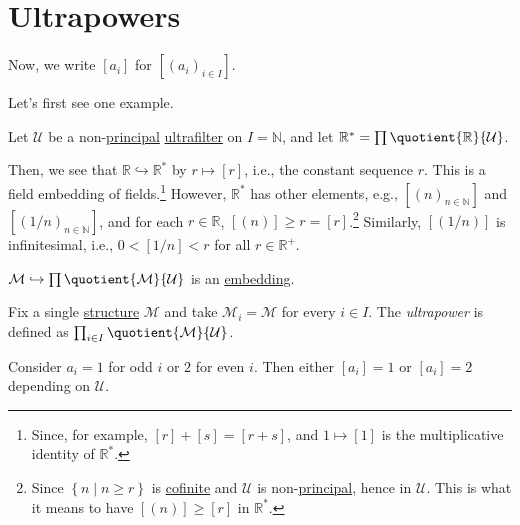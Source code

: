 \section{Ultrapowers}
\begin{notation}
	Now, we write \([a_i]\) for \([(a_i)_{i\in I}]\).
\end{notation}

Let's first see one example.

\begin{eg}
	Let \(\mathcal{U} \) be a non-\hyperref[eg:principal-filter]{principal} \hyperref[def:ultrafilter]{ultrafilter} on \(I = \mathbb{N} \), and let \(\mathbb{R} ^{\ast} = \prod \quotient{\mathbb{R} }{\mathcal{U} } \).

	Then, we see that \(\mathbb{R} \hookrightarrow \mathbb{R} ^{\ast} \) by \(r \mapsto [r]\), i.e., the constant sequence \(r\). This is a field embedding of fields.\footnote{Since, for example, \([r] + [s] = [r + s]\), and \(1 \mapsto [1]\) is the multiplicative identity of \(\mathbb{R} ^{\ast} \).} However, \(\mathbb{R} ^{\ast} \) has other elements, e.g., \([(n)_{n\in \mathbb{N} }]\) and \([(1 / n)_{n\in \mathbb{N} }]\), and for each \(r\in \mathbb{R} \), \([(n)] \geq r = [r]\).\footnote{Since \(\left\{ n \mid n \geq r \right\} \) is \hyperref[def:cofinite]{cofinite} and  \(\mathcal{U} \) is non-\hyperref[eg:principal-filter]{principal}, hence in \(\mathcal{U} \). This is what it means to have \([(n)] \geq [r]\) in \(\mathbb{R} ^{\ast} \).} Similarly, \([(1 / n)]\) is infinitesimal, i.e., \(0 < [1 / n] < r\) for all \(r\in \mathbb{R} ^+\).
\end{eg}

\begin{remark}
	\(\mathcal{M} \hookrightarrow \prod \quotient{\mathcal{M} }{\mathcal{U} } \) is an \hyperref[def:embedding]{embedding}.
\end{remark}

\begin{definition}[Ultrapower]\label{def:ultrapower}
	Fix a single \hyperref[def:structure]{structure} \(\mathcal{M} \) and take \(\mathcal{M} _i = \mathcal{M} \) for every \(i \in I\). The \emph{ultrapower} is defined as \(\prod_{i\in I} \quotient{\mathcal{M} }{\mathcal{U} } \).
\end{definition}

\begin{eg}
	Consider \(a_i = 1\) for odd \(i\) or \(2\) for even \(i\). Then either \([a_i] = 1\) or \([a_i] = 2\) depending on \(\mathcal{U} \).
\end{eg}

